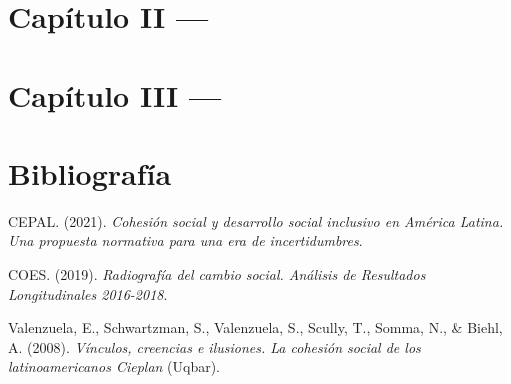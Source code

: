 \documentclass[
  12pt,
]{book}
\newlength{\cslhangindent}
\newlength{\cslentryspacingunit} %
\newenvironment{CSLReferences}[2] %
 {%
  \setlength{\parindent}{0pt}
  \ifodd #1
  \let\oldpar\par
  \def\par{\hangindent=\cslhangindent\oldpar}
  \fi
  \setlength{\parskip}{#2\cslentryspacingunit}
 }%
 {}
\begin{document}
\hypertarget{capuxedtulo-ii}{%
\chapter{Capítulo II ---}\label{capuxedtulo-ii}}

\hypertarget{capuxedtulo-iii}{%
\chapter{Capítulo III ---}\label{capuxedtulo-iii}}

\hypertarget{bibliografuxeda}{%
\chapter*{Bibliografía}\label{bibliografuxeda}}

\hypertarget{refs}{}
\begin{CSLReferences}{1}{0}
\leavevmode{}%
CEPAL. (2021). \emph{Cohesión social y desarrollo social inclusivo en {América Latina}. {Una} propuesta normativa para una era de incertidumbres}.

\leavevmode{}%
COES. (2019). \emph{Radiografía del cambio social. {Análisis} de {Resultados Longitudinales} 2016-2018}.

\leavevmode{}%
Valenzuela, E., Schwartzman, S., Valenzuela, S., Scully, T., Somma, N., \& Biehl, A. (2008). \emph{{Vínculos, creencias e ilusiones. La cohesión social de los latinoamericanos \textendash{} Cieplan}} (Uqbar).

\end{CSLReferences}
\end{document}
